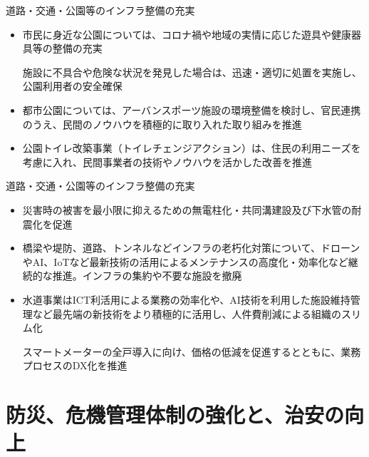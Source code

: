 \documentclass[dvipdfmx]{beamer}
\begin{document}
    \begin{frame}{道路・交通・公園等のインフラ整備の充実}{}
        \begin{small}
            \begin{itemize}
                \setlength{\parsep}{.5mm}
                \setlength{\itemsep}{2mm}
                \item 市民に身近な公園については、コロナ禍や地域の実情に応じた遊具や健康器具等の整備の充実\par
                施設に不具合や危険な状況を発見した場合は、迅速・適切に処置を実施し、公園利用者の安全確保
                \item 都市公園については、アーバンスポーツ施設の環境整備を検討し、官民連携のうえ、民間のノウハウを積極的に取り入れた取り組みを推進
                \item 公園トイレ改築事業（トイレチェンジアクション）は、住民の利用ニーズを考慮に入れ、民間事業者の技術やノウハウを活かした改善を推進
            \end{itemize}
        \end{small}
    \end{frame}

    \begin{frame}{道路・交通・公園等のインフラ整備の充実}{}
        \begin{small}
            \begin{itemize}
                \setlength{\parsep}{.5mm}
                \setlength{\itemsep}{2mm}
                \item 災害時の被害を最小限に抑えるための無電柱化・共同溝建設及び下水管の耐震化を促進
                \item 橋梁や堤防、道路、トンネルなどインフラの老朽化対策について、ドローンやAI、IoTなど最新技術の活用によるメンテナンスの高度化・効率化など継続的な推進。インフラの集約や不要な施設を撤廃
                \item 水道事業はICT利活用による業務の効率化や、AI技術を利用した施設維持管理など最先端の新技術をより積極的に活用し、人件費削減による組織のスリム化\par
                スマートメーターの全戸導入に向け、価格の低減を促進するとともに、業務プロセスのDX化を推進
            \end{itemize}
        \end{small}
    \end{frame}

\section{防災、危機管理体制の強化と、治安の向上}
    \begin{frame}{}{}
        \sectionpage
    \end{frame}
\end{document}
